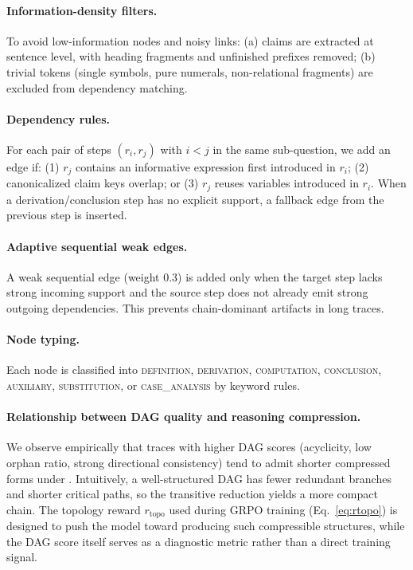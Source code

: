 \paragraph{Information-density filters.}
To avoid low-information nodes and noisy links: (a) claims are extracted at sentence level, with heading fragments and unfinished prefixes removed; (b) trivial tokens (single symbols, pure numerals, non-relational fragments) are excluded from dependency matching.

\paragraph{Dependency rules.}
For each pair of steps $(r_i, r_j)$ with $i<j$ in the same sub-question, we add an edge if: (1) $r_j$ contains an informative expression first introduced in $r_i$; (2) canonicalized claim keys overlap; or (3) $r_j$ reuses variables introduced in $r_i$.
When a derivation/conclusion step has no explicit support, a fallback edge from the previous step is inserted.

\paragraph{Adaptive sequential weak edges.}
A weak sequential edge (weight 0.3) is added only when the target step lacks strong incoming support and the source step does not already emit strong outgoing dependencies.
This prevents chain-dominant artifacts in long traces.

\paragraph{Node typing.}
Each node is classified into \textsc{definition}, \textsc{derivation}, \textsc{computation}, \textsc{conclusion}, \textsc{auxiliary}, \textsc{substitution}, or \textsc{case\_analysis} by keyword rules.

\paragraph{Relationship between DAG quality and reasoning compression.}
We observe empirically that traces with higher DAG scores (acyclicity, low orphan ratio, strong directional consistency) tend to admit shorter compressed forms under \framework.
Intuitively, a well-structured DAG has fewer redundant branches and shorter critical paths, so the transitive reduction yields a more compact chain.
The topology reward $r_{\mathrm{topo}}$ used during GRPO training (Eq.~\ref{eq:rtopo}) is designed to push the model toward producing such compressible structures, while the DAG score itself serves as a diagnostic metric rather than a direct training signal.

